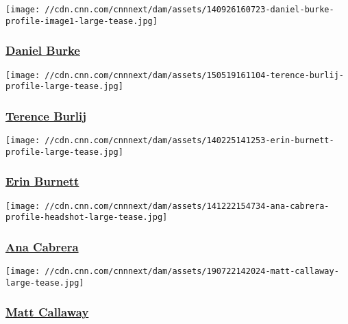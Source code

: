 \href{/profiles/daniel-burke}{}

\texttt{[image: //cdn.cnn.com/cnnnext/dam/assets/140926160723-daniel-burke-profile-image1-large-tease.jpg]}

\hypertarget{daniel-burke}{%
\subsubsection{\texorpdfstring{\href{/profiles/daniel-burke}{Daniel
Burke}}{Daniel Burke}}\label{daniel-burke}}

\href{/profiles/terence-burlij}{}

\texttt{[image: //cdn.cnn.com/cnnnext/dam/assets/150519161104-terence-burlij-profile-large-tease.jpg]}

\hypertarget{terence-burlij}{%
\subsubsection{\texorpdfstring{\href{/profiles/terence-burlij}{Terence
Burlij}}{Terence Burlij}}\label{terence-burlij}}

\href{/profiles/erin-burnett-profile}{}

\texttt{[image: //cdn.cnn.com/cnnnext/dam/assets/140225141253-erin-burnett-profile-large-tease.jpg]}

\hypertarget{erin-burnett}{%
\subsubsection{\texorpdfstring{\href{/profiles/erin-burnett-profile}{Erin
Burnett}}{Erin Burnett}}\label{erin-burnett}}

\href{/profiles/ana-cabrera-profile}{}

\texttt{[image: //cdn.cnn.com/cnnnext/dam/assets/141222154734-ana-cabrera-profile-headshot-large-tease.jpg]}

\hypertarget{ana-cabrera}{%
\subsubsection{\texorpdfstring{\href{/profiles/ana-cabrera-profile}{Ana
Cabrera}}{Ana Cabrera}}\label{ana-cabrera}}

\href{/profiles/matt-callaway}{}

\texttt{[image: //cdn.cnn.com/cnnnext/dam/assets/190722142024-matt-callaway-large-tease.jpg]}

\hypertarget{matt-callaway}{%
\subsubsection{\texorpdfstring{\href{/profiles/matt-callaway}{Matt
Callaway}}{Matt Callaway}}\label{matt-callaway}}

